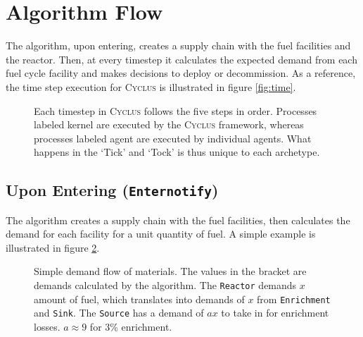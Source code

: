 \documentclass[12pt,letterpaper]{article}
\newcommand{\Cyclus}{\textsc{Cyclus}\xspace}%
\begin{document}
\section{Algorithm Flow}

The algorithm, upon entering, creates a supply chain with the fuel facilities and
the reactor. Then, at every timestep it calculates the expected demand from each fuel cycle
facility and makes decisions to deploy or decommission. As a reference, the time step
execution for \Cyclus is illustrated in figure \ref{fig:time}.

\begin{figure}[H]
\caption{Each timestep in \Cyclus follows the five steps in order. Processes labeled
         kernel are executed by the \Cyclus framework, whereas processes labeled agent
         are executed by individual agents. What happens in the `Tick' and `Tock' is
         thus unique to each archetype.}
\label{diag:time}
\end{figure}


\subsection{Upon Entering (\texttt{Enternotify})}

The algorithm creates a supply chain with the fuel facilities,
then calculates the demand for each facility for a unit quantity of fuel.
A simple example is illustrated in figure \ref{diag:dem}.

\begin{figure}[H]
\caption{Simple demand flow of materials. The values in the bracket are demands calculated
         by the algorithm. The \texttt{Reactor} demands $x$ amount of fuel,
         which translates into demands of $x$ from \texttt{Enrichment} and \texttt{Sink}.
         The \texttt{Source} has a demand of $a x$ to take in for enrichment losses.
         $a \approx 9 $ for 3\% enrichment.}
\label{diag:dem}
\end{figure}
\end{document}
